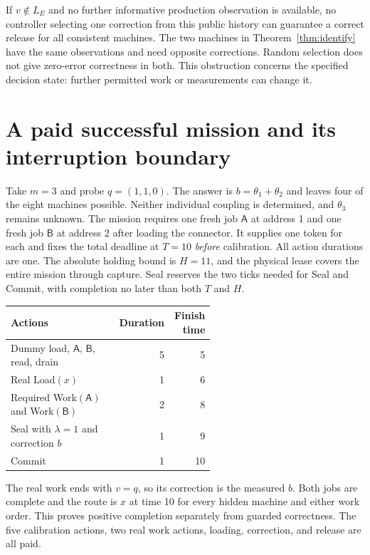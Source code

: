 \documentclass[11pt,a4paper]{article}
\theoremstyle{definition}
\begin{document}
If $v\notin L_E$ and no further informative production observation is
available, no controller selecting one correction from this public history
can guarantee a correct release for all consistent machines. The two
machines in Theorem~\ref{thm:identify} have the same observations and need
opposite corrections. Random selection does not give zero-error correctness
in both. This obstruction concerns the specified decision state: further
permitted work or measurements can change it.



\section{A paid successful mission and its interruption boundary}
\label{sec:mission}

Take $m=3$ and probe $q=(1,1,0)$. The answer is
$b=\theta_1+\theta_2$ and leaves four of the eight machines possible.
Neither individual coupling is determined, and $\theta_3$ remains unknown.
The mission requires one fresh job $\mathsf A$ at address 1 and one fresh
job $\mathsf B$ at address 2 after loading the connector. It supplies one
token for each and fixes the total deadline at $T=10$ \emph{before}
calibration. All action durations are one. The absolute holding bound is $H=11$,
and the physical lease covers the entire mission through capture. Seal
reserves the two ticks needed for Seal and Commit, with completion no later
than both $T$ and $H$.

\begin{center}
\begin{tabular}{@{}p{0.57\linewidth}rr@{}}
\toprule
Actions & Duration & Finish time\\
\midrule
Dummy load, $\mathsf A$, $\mathsf B$, read, drain & 5 & 5\\
Real Load$(x)$ & 1 & 6\\
Required Work$(\mathsf A)$ and Work$(\mathsf B)$ & 2 & 8\\
Seal with $\lambda=1$ and correction $b$ & 1 & 9\\
Commit & 1 & 10\\
\bottomrule
\end{tabular}
\end{center}

The real work ends with $v=q$, so its correction is the measured $b$.
Both jobs are complete and the route is $x$ at time 10 for every hidden
machine and either work order. This proves positive completion separately
from guarded correctness. The five calibration actions, two real work
actions, loading, correction, and release are all paid.
\end{document}
